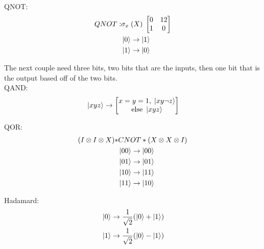\documentclass[12pt]{article}
\theoremstyle{plain}
\theoremstyle{nonumberplain}
\theoremstyle{plain}
\theoremstyle{nonumberplain}
\newcommand\1{{\bf 1}}
\newcommand{\bmat}[1]{\begin{bmatrix*} #1 \end{bmatrix*}} %
\newcommand{\<}{\left\langle}
\renewcommand{\>}{\right\rangle}
\begin{document}
QNOT:
\begin{equation}
\begin{split}
QNOT: &\sigma_x\;(X)\; \bmat{0&12\\1&0}\\
	  &\ket{0} \rightarrow \ket{1}\\
	  &\ket{1} \rightarrow \ket{0}\\	  
\end{split}
\end{equation}

The next couple need three bits, two bits that are the inputs, then one bit that is the output based off of the two bits.
\\

QAND:
\begin{equation}
\begin{split}
& \ket{xyz} \rightarrow \bmat{x=y=1,\; \ket{xy \neg z}\\ \text{else } \ket{xyz}}\\
\end{split}
\end{equation}

QOR:
\begin{equation}
\begin{split}
      (I \otimes I \otimes X) * &CNOT * (X \otimes X \otimes I)\\
	  &\ket{00} \rightarrow \ket{00}\\
	  &\ket{01} \rightarrow \ket{01}\\
	  &\ket{10} \rightarrow \ket{11}\\
	  &\ket{11} \rightarrow \ket{10}\\	
\end{split}
\end{equation}

Hadamard:
\begin{equation}
\begin{split}
      &\ket{0} \rightarrow \frac{1}{\sqrt{2}}(\ket{0}+\ket{1})\\
	  &\ket{1} \rightarrow \frac{1}{\sqrt{2}}(\ket{0}-\ket{1})\\	  
\end{split}
\end{equation}





\pagebreak
\end{document}
